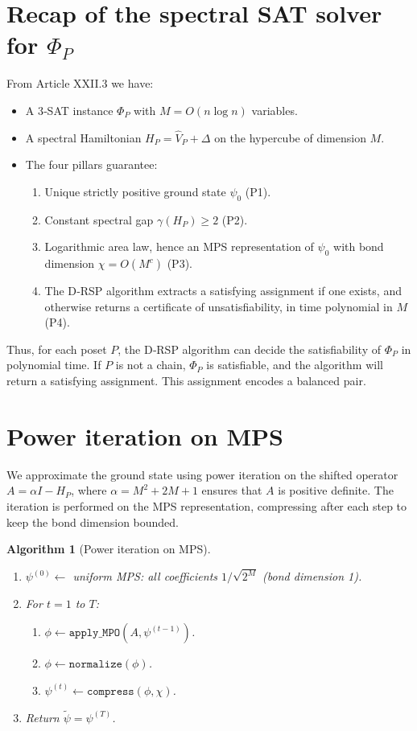 \documentclass[11pt,a4paper]{article}
\newtheorem{algorithm}{Algorithm}[section]
\begin{document}
\section{Recap of the spectral SAT solver for $\Phi_P$}

From Article XXII.3 we have:
\begin{itemize}
\item A 3‑SAT instance $\Phi_P$ with $M = O(n \log n)$ variables.
\item A spectral Hamiltonian $H_P = \hat{V}_P + \Delta$ on the hypercube of dimension $M$.
\item The four pillars guarantee:
  \begin{enumerate}
  \item Unique strictly positive ground state $\psi_0$ (P1).
  \item Constant spectral gap $\gamma(H_P) \ge 2$ (P2).
  \item Logarithmic area law, hence an MPS representation of $\psi_0$ with bond dimension $\chi = O(M^c)$ (P3).
  \item The D‑RSP algorithm extracts a satisfying assignment if one exists, and otherwise returns a certificate of unsatisfiability, in time polynomial in $M$ (P4).
  \end{enumerate}
\end{itemize}
Thus, for each poset $P$, the D‑RSP algorithm can decide the satisfiability of $\Phi_P$ in polynomial time. If $P$ is not a chain, $\Phi_P$ is satisfiable, and the algorithm will return a satisfying assignment. This assignment encodes a balanced pair.

\section{Power iteration on MPS}

We approximate the ground state using power iteration on the shifted operator $A = \alpha I - H_P$, where $\alpha = M^2 + 2M + 1$ ensures that $A$ is positive definite. The iteration is performed on the MPS representation, compressing after each step to keep the bond dimension bounded.

\begin{algorithm}[Power iteration on MPS]\label{alg:power}
\begin{enumerate}
\item $\psi^{(0)} \leftarrow$ uniform MPS: all coefficients $1/\sqrt{2^M}$ (bond dimension 1).
\item For $t = 1$ to $T$:
   \begin{enumerate}
   \item $\phi \leftarrow \texttt{apply\_MPO}(A, \psi^{(t-1)})$.
   \item $\phi \leftarrow \texttt{normalize}(\phi)$.
   \item $\psi^{(t)} \leftarrow \texttt{compress}(\phi, \chi)$.
   \end{enumerate}
\item Return $\tilde{\psi} = \psi^{(T)}$.
\end{enumerate}
\end{algorithm}
\end{document}
